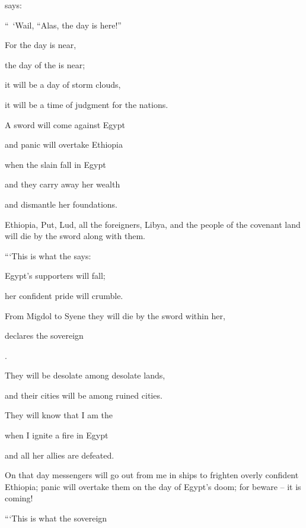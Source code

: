 {{}
says:
\par }{\Q “ ‘Wail,
“Alas,
the day is here!”
\par }{\Q {}For
the day
is near,
\par }{\Q the day
of the {}
is near;
\par }{\Q it will be a day
of storm clouds,
\par }{\Q it will be a time
of judgment for the nations.
\par }{\Q {}A sword
will come
against Egypt
\par }{\Q and panic
will overtake
Ethiopia
\par }{\Q when the slain
fall
in Egypt
\par }{\Q and they carry away
her wealth
\par }{\Q and dismantle
her foundations.
\par }{\PP {}Ethiopia,
Put,
Lud,
all
the foreigners, Libya,
and the people of the covenant
land
will die
by the sword
along with them.
\par }{\Q {}“‘This is what
the
{}
says:
\par }{\Q Egypt’s
supporters
will fall;
\par }{\Q her confident pride
will crumble.
\par }{\Q From Migdol
to Syene
they will die
by the sword
within her,
\par }{\Q declares
the sovereign

{}.
\par }{\Q {}They will be desolate
among
desolate
lands,
\par }{\Q and their cities
will be
among
ruined
cities.
\par }{\Q {}They will know
that
I am
the {}
\par }{\Q when I ignite
a fire
in Egypt
\par }{\Q and all
her allies are defeated.
\par }{\PP {}On that
day
messengers
will go out
from
me in ships
to frighten
overly confident
Ethiopia;
panic
will overtake
them on the day
of Egypt’s
doom; for
beware
– it is coming!
\par }{\Q {}“‘This is what
the sovereign

}
